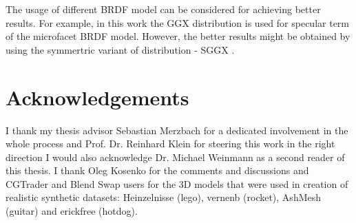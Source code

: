 The usage of different BRDF model can be considered for achieving better results.
For example, in this work the GGX distribution \cite{walter2007microfacet}
is used for specular term of the microfacet BRDF model.
However, the better results might be obtained by using the symmertric variant of distribution - SGGX \cite{heitz2015sggx}.



\section{Acknowledgements}

I thank my thesis advisor Sebastian Merzbach for a dedicated involvement in the whole process
and Prof. Dr. Reinhard Klein for steering this work in the right direction
\textit{}
I would also acknowledge Dr. Michael Weinmann as a second reader of this thesis.
I thank Oleg Kosenko for the comments and discussions
and CGTrader and Blend Swap users for the 3D models
that were used in creation of realistic synthetic datasets:
Heinzelnisse (lego), vernenb (rocket), AshMesh (guitar) and erickfree (hotdog).

